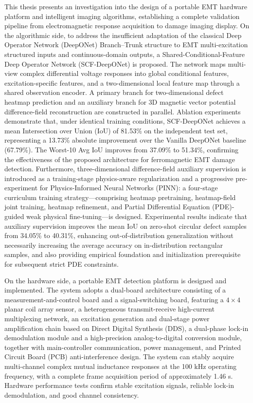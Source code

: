 \begin{englishabstract}
This thesis presents an investigation into the design of a portable EMT hardware platform and intelligent imaging algorithms, establishing a complete validation pipeline from electromagnetic response acquisition to damage imaging display. On the algorithmic side, to address the insufficient adaptation of the classical Deep Operator Network (DeepONet) Branch--Trunk structure to EMT multi-excitation structured inputs and continuous-domain outputs, a Shared-Conditional-Feature Deep Operator Network (SCF-DeepONet) is proposed. The network maps multi-view complex differential voltage responses into global conditional features, excitation-specific features, and a two-dimensional local feature map through a shared observation encoder. A primary branch for two-dimensional defect heatmap prediction and an auxiliary branch for 3D magnetic vector potential difference-field reconstruction are constructed in parallel. Ablation experiments demonstrate that, under identical training conditions, SCF-DeepONet achieves a mean Intersection over Union (IoU) of 81.53\% on the independent test set, representing a 13.73\% absolute improvement over the Vanilla DeepONet baseline (67.79\%). The Worst-10 Avg IoU improves from 37.09\% to 51.34\%, confirming the effectiveness of the proposed architecture for ferromagnetic EMT damage detection. Furthermore, three-dimensional difference-field auxiliary supervision is introduced as a training-stage physics-aware regularization and a progressive pre-experiment for Physics-Informed Neural Networks (PINN): a four-stage curriculum training strategy—comprising heatmap pretraining, heatmap-field joint training, heatmap refinement, and Partial Differential Equation (PDE)-guided weak physical fine-tuning—is designed. Experimental results indicate that auxiliary supervision improves the mean IoU on zero-shot circular defect samples from 34.05\% to 40.31\%, enhancing out-of-distribution generalization without necessarily increasing the average accuracy on in-distribution rectangular samples, and also providing empirical foundation and initialization prerequisite for subsequent strict PDE constraints.

On the hardware side, a portable EMT detection platform is designed and implemented. The system adopts a dual-board architecture consisting of a measurement-and-control board and a signal-switching board, featuring a $4 \times 4$ planar coil array sensor, a heterogeneous transmit-receive high-current multiplexing network, an excitation generation and dual-stage power amplification chain based on Direct Digital Synthesis (DDS), a dual-phase lock-in demodulation module and a high-precision analog-to-digital conversion module, together with main-controller communication, power management, and Printed Circuit Board (PCB) anti-interference design. The system can stably acquire multi-channel complex mutual inductance responses at the 100 kHz operating frequency, with a complete frame acquisition period of approximately 1.46 s. Hardware performance tests confirm stable excitation signals, reliable lock-in demodulation, and good channel consistency.


\end{englishabstract}
